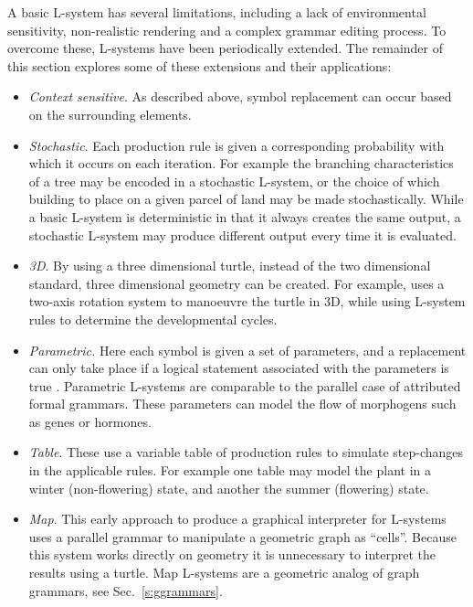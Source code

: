 A basic L-system has several limitations, including a lack of environmental sensitivity, non-realistic rendering and a complex grammar editing process. To overcome these, L-systems have been periodically extended. The remainder of this section explores some of these extensions and their applications:

\begin{itemize}
\item{\emph{Context sensitive}. As described above, symbol replacement can occur based on the surrounding elements.}
\item{\emph{Stochastic}. Each production rule is given a corresponding probability with which it occurs on each iteration\cite{Yokomori80}. For example the branching characteristics of a tree may be encoded in a stochastic L-system\cite{Prusinkiewicz94}, or the choice of which building to place on a given parcel of land\cite{Parish01} may be made stochastically. While a basic L-system is deterministic in that it always creates the same output, a stochastic L-system may produce different output every time it is evaluated.}
\item{\emph{3D}. By using a three dimensional turtle, instead of the two dimensional standard, three dimensional geometry can be created. For example, \cite{Prusinkiewicz88} uses a two-axis rotation system to manoeuvre the turtle in 3D, while using L-system rules to determine the developmental cycles.}
\item{\emph{Parametric.} Here each symbol is given a set of parameters, and a replacement can only take place if a logical statement associated with the parameters is true \cite{Hanan92}. Parametric L-systems are comparable to the parallel case of attributed formal grammars\cite{Knuth68}. These parameters can model the flow of morphogens such as genes or hormones\cite{Buck05}.}
\item{\emph{Table}. These use a variable table of production rules to simulate step-changes in the applicable rules. For example one table may model the plant in a winter (non-flowering) state, and another the summer (flowering) state.}
\item{\emph{Map}. This early approach to produce a graphical interpreter for  L-systems uses a parallel grammar to manipulate a geometric graph as ``cells''\cite{Lindenmayer79}. Because this system works directly on geometry it is unnecessary to interpret the results using a turtle. Map L-systems are a geometric analog of graph grammars, see Sec.~\ref{s:ggrammars}.}

\end{itemize}
